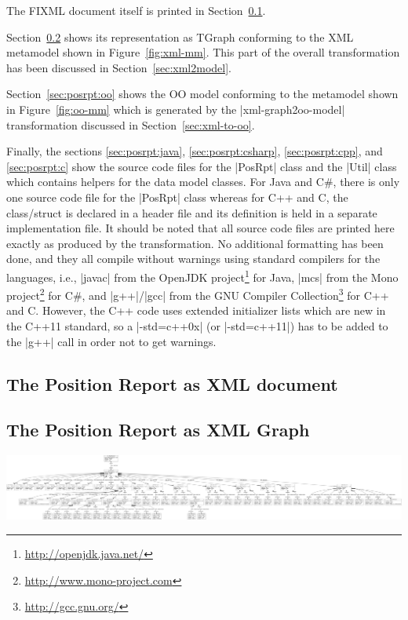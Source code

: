 \documentclass[a4paper]{article}
\newcommand{\code}{\clojureinline}
\begin{document}
The FIXML document itself is printed in Section~\ref{sec:posrpt:xml}.

Section~\ref{sec:posrpt:xml-graph} shows its representation as TGraph
conforming to the XML metamodel shown in Figure~\ref{fig:xml-mm}.  This part of
the overall transformation has been discussed in Section~\ref{sec:xml2model}.

Section~\ref{sec:posrpt:oo} shows the OO model conforming to the metamodel
shown in Figure~\ref{fig:oo-mm} which is generated by the
\code|xml-graph2oo-model| transformation discussed in
Section~\ref{sec:xml-to-oo}.

Finally, the sections \ref{sec:posrpt:java}, \ref{sec:posrpt:csharp},
\ref{sec:posrpt:cpp}, and \ref{sec:posrpt:c} show the source code files for the
\code|PosRpt| class and the \code|Util| class which contains helpers for the
data model classes.  For Java and C\#, there is only one source code file for
the \code|PosRpt| class whereas for C++ and C, the class/struct is declared in
a header file and its definition is held in a separate implementation file.  It
should be noted that all source code files are printed here exactly as produced
by the transformation.  No additional formatting has been done, and they all
compile without warnings using standard compilers for the languages, i.e.,
\code|javac| from the OpenJDK project\footnote{\url{http://openjdk.java.net/}}
for Java, \code|mcs| from the Mono
project\footnote{\url{http://www.mono-project.com}} for C\#, and
\code|g++|/\code|gcc| from the GNU Compiler
Collection\footnote{\url{http://gcc.gnu.org/}} for C++ and C.  However, the C++
code uses extended initializer lists which are new in the C++11 standard, so a
\code|-std=c++0x| (or \code|-std=c++11|) has to be added to the \code|g++| call
in order not to get warnings.


\subsection{The Position Report as XML document}
\label{sec:posrpt:xml}


\newpage
\subsection{The Position Report as XML Graph}
\label{sec:posrpt:xml-graph}
\begin{center}
  \includegraphics[angle=90,height=.95\textheight]{xml-test2}
\end{center}
\end{document}
